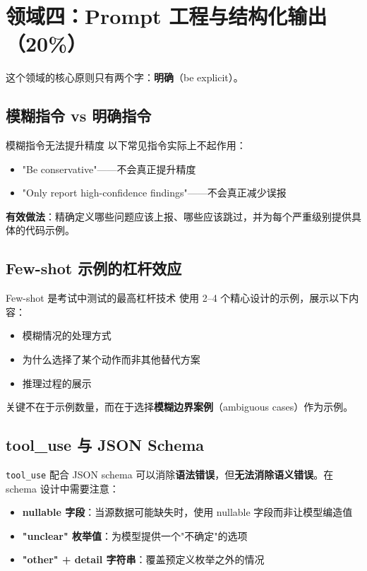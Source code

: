 \section{领域四：Prompt 工程与结构化输出（20\%）}

这个领域的核心原则只有两个字：\textbf{明确}（be explicit）。

\subsection{模糊指令 vs 明确指令}

\begin{warningbox}{模糊指令无法提升精度}
以下常见指令实际上不起作用：
\begin{itemize}[leftmargin=1.5em]
    \item "Be conservative"——不会真正提升精度
    \item "Only report high-confidence findings"——不会真正减少误报
\end{itemize}
\textbf{有效做法}：精确定义哪些问题应该上报、哪些应该跳过，并为每个严重级别提供具体的代码示例。
\end{warningbox}

\subsection{Few-shot 示例的杠杆效应}

\begin{importantbox}{Few-shot 是考试中测试的最高杠杆技术}
使用 2--4 个精心设计的示例，展示以下内容：
\begin{itemize}[leftmargin=1.5em]
    \item 模糊情况的处理方式
    \item 为什么选择了某个动作而非其他替代方案
    \item 推理过程的展示
\end{itemize}
关键不在于示例数量，而在于选择\textbf{模糊边界案例}（ambiguous cases）作为示例。
\end{importantbox}

\subsection{tool\_use 与 JSON Schema}

\texttt{tool\_use} 配合 JSON schema 可以消除\textbf{语法错误}，但\textbf{无法消除语义错误}。在 schema 设计中需要注意：

\begin{itemize}[leftmargin=1.5em]
    \item \textbf{nullable 字段}：当源数据可能缺失时，使用 nullable 字段而非让模型编造值
    \item \textbf{"unclear" 枚举值}：为模型提供一个"不确定"的选项
    \item \textbf{"other" + detail 字符串}：覆盖预定义枚举之外的情况
\end{itemize}

